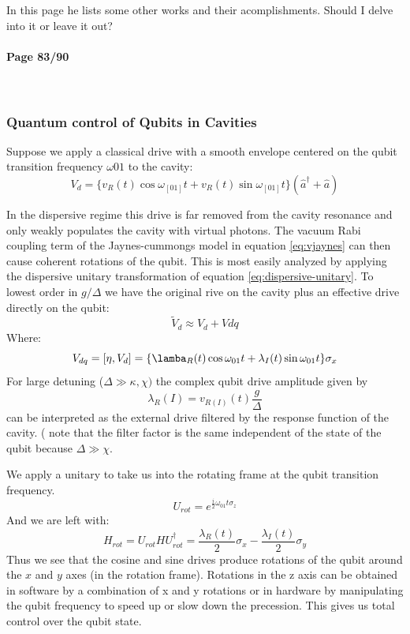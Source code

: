 \documentclass[12pt]{article}
\numberwithin{equation}{subsection}
\newcommand\ask[1]{
{\color{red}
#1
}
}
\newcommand\page[1]{
{
\color{blue}\paragraph{
Page #1
}\mbox{}\\
}
}
\begin{document}
\ask{In this page he lists some other works and their acomplishments. Should I delve into it or leave it out?}

\page{83/90}
\subsubsection{Quantum control of Qubits in Cavities}
Suppose we apply a classical drive with a smooth envelope centered on the qubit transition frequency $\omega{01}$ to the cavity:
\begin{equation}
    V_d = \{v_R(t)\cos\omega_[01]t + v_R(t)\sin\omega_[01]t \} (\hat a^\dagger + \hat a)
\end{equation}

In the dispersive regime this drive is far removed from the cavity resonance and only weakly populates the cavity with virtual photons. The vacuum Rabi coupling term of the Jaynes-cummongs model in equation \ref{eq:vjaynes} can then cause coherent rotations of the qubit. This is most easily analyzed by applying the dispersive unitary transformation of equation \ref{eq:dispersive-unitary}. To lowest order in $g/\Delta$ we have the original rive on the cavity plus an effective drive directly on the qubit:
\begin{equation}
\tilde V_d \approx V_d+V{dq}
\end{equation}
Where:
\begin{equation}
    V_{dq} = [\eta, V_d] = \{ \lamba_R(t) \cos\omega_{01} t + \lambda_I(t)\sin\omega_{01} t   \} \sigma_x
\end{equation}
For large detuning ($\Delta \gg \kappa, \chi)$  the complex qubit drive amplitude given by
\begin{equation}
    \lambda_R(I) = v_{R(I)} (t) \frac{g}{\Delta}
\end{equation}
can be interpreted as the external drive filtered by the response function of the cavity. ( note that the filter factor is the same independent of the state of the qubit because $\Delta \gg \chi$.

We apply a unitary to take us into the rotating frame at the qubit transition frequency.
\begin{equation}
    U_{rot} = e^{\frac{i}{2} \omega_{01}t \sigma_z}
\end{equation}
And we are left with:
\begin{equation}
    H_{rot} = U_{rot} H U_{rot}^\dagger = \frac{\lambda_R(t)}{2} \sigma_x - \frac{\lambda_I(t)}{2} \sigma_y
\end{equation}
Thus we see that the cosine and sine drives produce rotations of the qubit around the $x$ and $y$ axes (in the rotation frame). Rotations in the z axis can be obtained in software by a combination of x and y rotations or in hardware by manipulating the qubit frequency to speed up or slow down the precession.
This gives us total control over the qubit state. %
\end{document}
